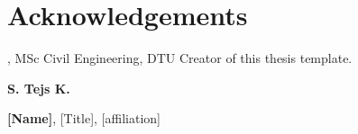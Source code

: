\section*{Acknowledgements}
\textbf{\thesisauthor}, MSc Civil Engineering, DTU \newline
Creator of this thesis template.

\textbf{S. Tejs K.} \newline

\textbf{[Name]}, [Title], [affiliation] \newline
[text]

